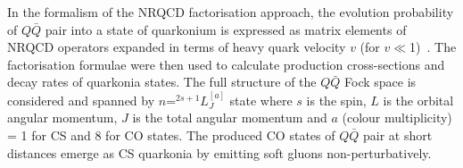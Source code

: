 In the formalism of the NRQCD factorisation approach, the evolution probability of $Q\bar{Q}$
pair into a state of quarkonium is expressed as matrix elements of NRQCD operators expanded
in terms of heavy quark velocity $v$ (for $v\ll$1)~\cite{Bodwin:1994jh}.
The factorisation formulae were then used to calculate production cross-sections
and decay rates of quarkonia states.
The full structure of the $Q\bar{Q}$ Fock space
is considered and spanned by $n$=$^{2s+1}L_J^{[a]}$ state where $s$
is the spin, $L$ is the orbital angular momentum, $J$ is the total angular momentum
and $a$ (colour multiplicity) = 1 for CS and 8 for CO states. 
The produced CO states of $Q\bar{Q}$ pair at short distances emerge as 
CS quarkonia by emitting soft gluons non-perturbatively.

